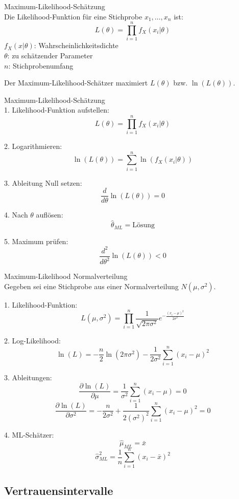 \begin{definition}{Maximum-Likelihood-Schätzung}\\
Die Likelihood-Funktion für eine Stichprobe $x_1,\ldots,x_n$ ist:
$$
L(\theta)=\prod_{i=1}^n f_X(x_i|\theta)
$$
$f_X(x|\theta)$: Wahrscheinlichkeitsdichte\\
$\theta$: zu schätzender Parameter\\
$n$: Stichprobenumfang

Der Maximum-Likelihood-Schätzer maximiert $L(\theta)$ bzw. $\ln(L(\theta))$.
\end{definition}

\begin{KR}{Maximum-Likelihood-Schätzung}\\
1. Likelihood-Funktion aufstellen:
   $$L(\theta)=\prod_{i=1}^n f_X(x_i|\theta)$$

2. Logarithmieren:
   $$\ln(L(\theta))=\sum_{i=1}^n \ln(f_X(x_i|\theta))$$

3. Ableitung Null setzen:
   $$\frac{d}{d\theta}\ln(L(\theta))=0$$

4. Nach $\theta$ auflösen:
   $$\hat{\theta}_{ML}=\text{Lösung}$$

5. Maximum prüfen:
   $$\frac{d^2}{d\theta^2}\ln(L(\theta)) < 0$$
\end{KR}

\begin{example2}{Maximum-Likelihood Normalverteilung}\\
Gegeben sei eine Stichprobe aus einer Normalverteilung $N(\mu,\sigma^2)$.

1. Likelihood-Funktion:
$$L(\mu,\sigma^2)=\prod_{i=1}^n \frac{1}{\sqrt{2\pi\sigma^2}}e^{-\frac{(x_i-\mu)^2}{2\sigma^2}}$$

2. Log-Likelihood:
$$\ln(L)=-\frac{n}{2}\ln(2\pi\sigma^2)-\frac{1}{2\sigma^2}\sum_{i=1}^n(x_i-\mu)^2$$

3. Ableitungen:
$$\frac{\partial \ln(L)}{\partial \mu}=\frac{1}{\sigma^2}\sum_{i=1}^n(x_i-\mu)=0$$
$$\frac{\partial \ln(L)}{\partial \sigma^2}=-\frac{n}{2\sigma^2}+\frac{1}{2(\sigma^2)^2}\sum_{i=1}^n(x_i-\mu)^2=0$$

4. ML-Schätzer:
$$\hat{\mu}_{ML}=\bar{x}$$
$$\hat{\sigma}^2_{ML}=\frac{1}{n}\sum_{i=1}^n(x_i-\bar{x})^2$$
\end{example2}

\subsection{Vertrauensintervalle}

